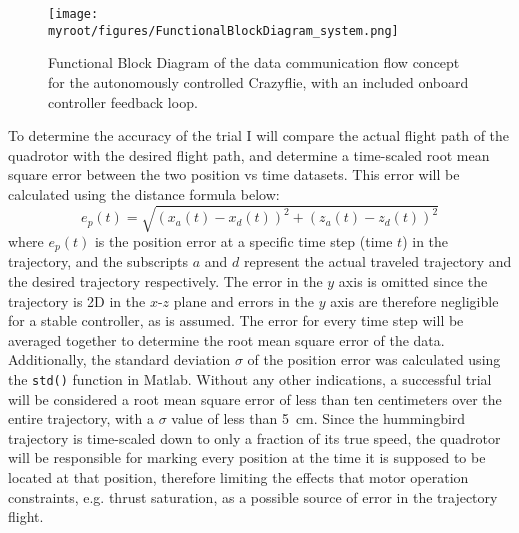\documentclass[onecolumn,10pt]{IEEEtran}
\newcommand{\myroot}{../}
\newcommand{\MATLAB}{Matlab}
\begin{document}
\begin{figure}
\begin{center}
\texttt{[image: \\myroot/figures/FunctionalBlockDiagram\_system.png]}
\end{center}
\caption{Functional Block Diagram of the data communication flow concept for the autonomously controlled Crazyflie, with an included onboard controller feedback loop.}
\label{fig:demonstration-2}
\end{figure}

To determine the accuracy of the trial I will compare the actual flight path of the quadrotor with the desired flight path, and determine a time-scaled root mean square error between the two position vs time datasets. This error will be calculated using the distance formula  below:
\begin{equation}
e_p(t) = \sqrt{(x_a(t)-x_d(t))^2 + (z_a(t)-z_d(t))^2}
\label{eq:demonstration-1}
\end{equation}
where $e_p(t)$ is the position error at a specific time step (time $t$) in the trajectory, and the subscripts $a$ and $d$ represent the actual traveled trajectory and the desired trajectory respectively. The error in the $y$ axis is omitted since the trajectory is 2D in the $x$-$z$ plane and errors in the $y$ axis are therefore negligible for a stable controller, as is assumed. The error for every time step will be averaged together to determine the root mean square error of the data. Additionally, the standard deviation $\sigma$ of the position error was calculated using the \lstinline{std()} function in \MATLAB. Without any other indications, a successful trial will be considered a root mean square error of less than ten centimeters over the entire trajectory, with a $\sigma$ value of less than \SI{5}{\centi\meter}. Since the hummingbird trajectory is time-scaled down to only a fraction of its true speed, the quadrotor will be responsible for marking every position at the time it is supposed to be located at that position, therefore limiting the effects that motor operation constraints, e.g. thrust saturation, as a possible source of error in the trajectory flight.
\end{document}
